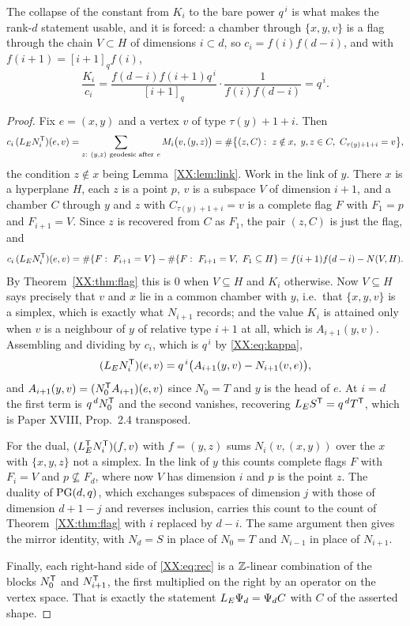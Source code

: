 The collapse of the constant from $K_i$ to the bare power $q^{\,i}$ is what makes the
rank-$d$ statement usable, and it is forced: a chamber through $\{x,y,v\}$ is a flag through
the chain $V\subset H$ of dimensions $i\subset d$, so $c_i=f(i)f(d-i)$, and with
$f(i+1)=[i+1]_qf(i)$,
\begin{equation}\label{XX:eq:kappa}
  \frac{K_i}{c_i}
  =\frac{f(d-i)f(i+1)q^{\,i}}{[i+1]_q}\cdot\frac{1}{f(i)f(d-i)}=q^{\,i}.
\end{equation}

\begin{proof}
Fix $e=(x,y)$ and a vertex $v$ of type $\tau(y)+1+i$. Then
\[
  c_i\,(\LE N_i^{\tp})(e,v)=\sum_{z:\ (y,z)\ \text{geodesic after}\ e} M_i\bigl(v,(y,z)\bigr)
  =\#\bigl\{(z,C):\ z\notin x,\ y,z\in C,\ C_{\tau(y)+1+i}=v\bigr\},
\]
the condition $z\notin x$ being Lemma~\ref{XX:lem:link}. Work in the link of $y$. There $x$ is a
hyperplane $H$, each $z$ is a point $p$, $v$ is a subspace $V$ of dimension $i+1$, and a
chamber $C$ through $y$ and $z$ with $C_{\tau(y)+1+i}=v$ is a complete flag $F$ with $F_1=p$
and $F_{i+1}=V$. Since $z$ is recovered from $C$ as $F_1$, the pair $(z,C)$ is just the flag,
and
\[
  c_i\,(L_E N_i^{\mathsf{T}})(e,v)=\#\{F:\ F_{i+1}=V\}-\#\{F:\ F_{i+1}=V,\ F_1\subseteq H\}
  =f(i+1)f(d-i)-N(V,H).
\]
By Theorem~\ref{XX:thm:flag} this is $0$ when $V\subseteq H$ and $K_i$ otherwise. Now
$V\subseteq H$ says precisely that $v$ and $x$ lie in a common chamber with $y$, i.e.\ that
$\{x,y,v\}$ is a simplex, which is exactly what $N_{i+1}$ records; and the value $K_i$ is
attained only when $v$ is a neighbour of $y$ of relative type $i+1$ at all, which is
$A_{i+1}(y,v)$. Assembling and dividing by $c_i$, which is $q^{\,i}$ by \eqref{XX:eq:kappa},
\[
  (L_E N_i^{\mathsf{T}})(e,v)=q^{\,i}\bigl(A_{i+1}(y,v)-N_{i+1}(v,e)\bigr),
\]
and $A_{i+1}(y,v)=(N_0^{\mathsf{T}}A_{i+1})(e,v)$ since $N_0=T$ and $y$ is the head of $e$. At
$i=d$ the first term is $q^{\,d}N_0^{\mathsf{T}}$ and the second vanishes, recovering
$L_E S^{\mathsf{T}}=q^{\,d}T^{\mathsf{T}}$, which is Paper XVIII, Prop.~2.4 transposed.

For the dual, $(L_E^{\mathsf{T}}N_i^{\mathsf{T}})(f,v)$ with $f=(y,z)$ sums $N_i(v,(x,y))$ over the $x$ with
$\{x,y,z\}$ not a simplex. In the link of $y$ this counts complete flags $F$ with $F_i=V$ and
$p\not\subseteq F_d$, where now $V$ has dimension $i$ and $p$ is the point $z$. The duality
of $\mathrm{PG}(d,q)$, which exchanges subspaces of dimension $j$ with those of dimension $d+1-j$
and reverses inclusion, carries this count to the count of Theorem~\ref{XX:thm:flag} with $i$
replaced by $d-i$. The same argument then gives the mirror identity, with $N_d=S$ in place of
$N_0=T$ and $N_{i-1}$ in place of $N_{i+1}$.

Finally, each right-hand side of \eqref{XX:eq:rec} is a $\mathbb{Z}$-linear combination of the blocks
$N_0^{\mathsf{T}}$ and $N_{i+1}^{\mathsf{T}}$, the first multiplied on the right by an operator on the
vertex space. That is exactly the statement $L_E\Psi_d=\Psi_dC$ with $C$ of the asserted
shape.
\end{proof}

